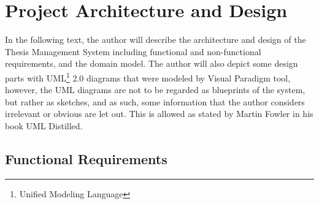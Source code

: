 \chapter{Project Architecture and Design}

In the following text, the author will describe the architecture and design of the Thesis Management System including functional and non-functional requirements, and the domain model. The author will also depict some design parts with UML\footnote{Unified Modeling Language} 2.0 diagrams that were modeled by Visual Paradigm tool\cite{visual-paradigm-homepage}, however, the UML diagrams are not to be regarded as blueprints of the system, but rather as sketches, and as such, some information that the author considers irrelevant or obvious are let out. This is allowed as stated by Martin Fowler in his book UML Distilled\cite{fowler-uml}.

\section{Functional Requirements}

